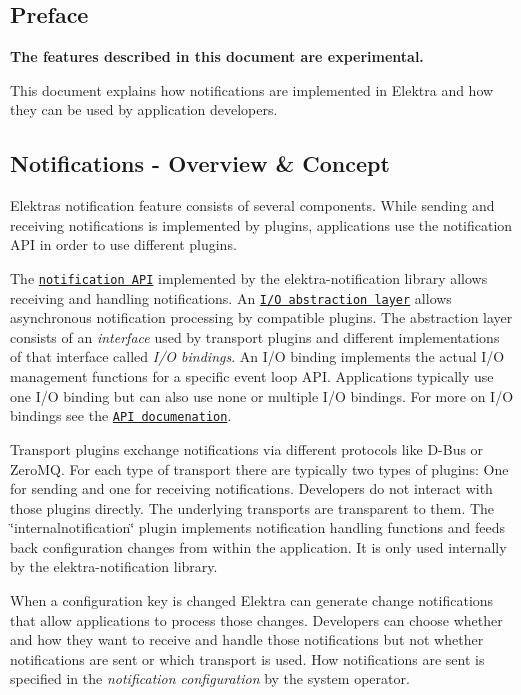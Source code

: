 \subsection*{Preface}

{\bfseries The features described in this document are experimental.}

This document explains how notifications are implemented in Elektra and how they can be used by application developers.

\subsection*{Notifications -\/ Overview \& Concept}

Elektra\textquotesingle{}s notification feature consists of several components. While sending and receiving notifications is implemented by plugins, applications use the notification A\+PI in order to use different plugins.

The \href{https://doc.libelektra.org/api/current/html/group__kdbnotification.html}{\tt notification A\+PI} implemented by the {\ttfamily elektra-\/notification} library allows receiving and handling notifications. An \href{https://doc.libelektra.org/api/current/html/group__kdbio.html}{\tt I/O abstraction layer} allows asynchronous notification processing by compatible plugins. The abstraction layer consists of an {\itshape interface} used by transport plugins and different implementations of that interface called {\itshape I/O bindings}. An I/O binding implements the actual I/O management functions for a specific event loop A\+PI. Applications typically use one I/O binding but can also use none or multiple I/O bindings. For more on I/O bindings see the \href{https://doc.libelektra.org/api/current/html/group__kdbio.html}{\tt A\+PI documenation}.

Transport plugins exchange notifications via different protocols like D-\/\+Bus or Zero\+MQ. For each type of transport there are typically two types of plugins\+: One for sending and one for receiving notifications. Developers do not interact with those plugins directly. The underlying transports are transparent to them. The \char`\"{}internalnotification\char`\"{} plugin implements notification handling functions and feeds back configuration changes from within the application. It is only used internally by the {\ttfamily elektra-\/notification} library.



When a configuration key is changed Elektra can generate change notifications that allow applications to process those changes. Developers can choose whether and how they want to receive and handle those notifications but not whether notifications are sent or which transport is used. How notifications are sent is specified in the {\itshape notification configuration} by the system operator.

